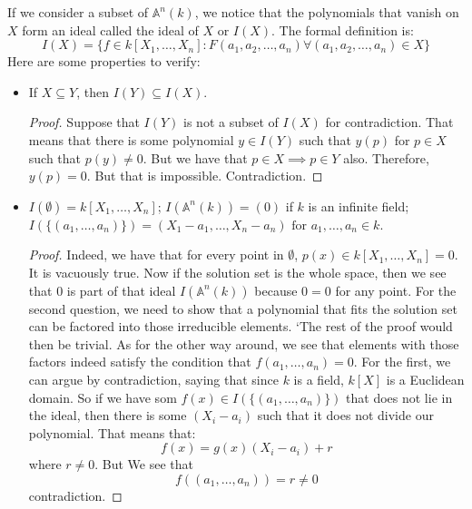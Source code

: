 \documentclass{report}
\begin{document}
If we consider a subset of $\mathbb{A}^{n}(k)$, we notice that the polynomials that vanish on $X$ form an ideal called the ideal of $X$ or $I(X)$. The formal definition is:
    \begin{equation*}
        I(X) = \{f \in k[X_{1}, \ldots, X_{n}] : F(a_{1}, a_{2}, \ldots, a_{n}) \forall (a_{1}, a_{2}, \ldots, a_{n}) \in X\}
    \end{equation*}
Here are some properties to verify:
    \begin{itemize}
        \item If $X \subseteq Y$, then $I(Y) \subseteq I(X)$.
            \begin{proof}
                Suppose that $I(Y)$ is not a subset of $I(X)$ for contradiction. That means that there is some polynomial $y \in I(Y)$ such that $y(p)$ for $p \in X$ such that $p(y) \neq 0$. But we have that $p \in X \implies p \in Y$ also. Therefore, $y(p) = 0$. But that is impossible. Contradiction.
            \end{proof}

        \item  $I(\emptyset) = k[X_{1}, \ldots, X_{n}]$; $I(\mathbb{A}^{n}(k)) = (0)$ if $k$ is an infinite field; $I(\{(a_{1}, \ldots, a_{n})\}) = (X_{1} - a_{1}, \ldots, X_{n} - a_{n}) \text{ for } a_{1}, \ldots, a_{n} \in k$.
            \begin{proof}
                Indeed, we have that for every point in $\emptyset$, $p(x) \in k[X_{1}, \ldots, X_{n}] = 0$. It is vacuously true. Now if the solution set is the whole space, then we see that $0$ is part of that ideal $I(\mathbb{A}^{n}(k))$ because $0 = 0$ for any point. For the second question, we need to show that a polynomial that fits the solution set can be factored into those irreducible elements. `The rest of the proof would then be trivial. As for the other way around, we see that elements with those factors indeed satisfy the condition that $f(a_{1}, \ldots, a_{n}) = 0$. For the first, we can argue by contradiction, saying that since $k$ is a field, $k[X]$ is a Euclidean domain. So if we have som $f(x) \in I(\{(a_{1}, \ldots, a_{n})\})$ that does not lie in the ideal, then there is some $(X_{i} - a_{i})$ such that it does not divide our polynomial. That means that:
                    \begin{equation*}
                        f(x) = g(x)(X_{i} - a_{i}) + r
                    \end{equation*}
                where $r \neq 0$. But We see that
                    \begin{equation*}
                        f((a_{1}, \ldots, a_{n})) = r \neq 0
                    \end{equation*}
                contradiction. 
            \end{proof}


\end{itemize}
\end{document}
